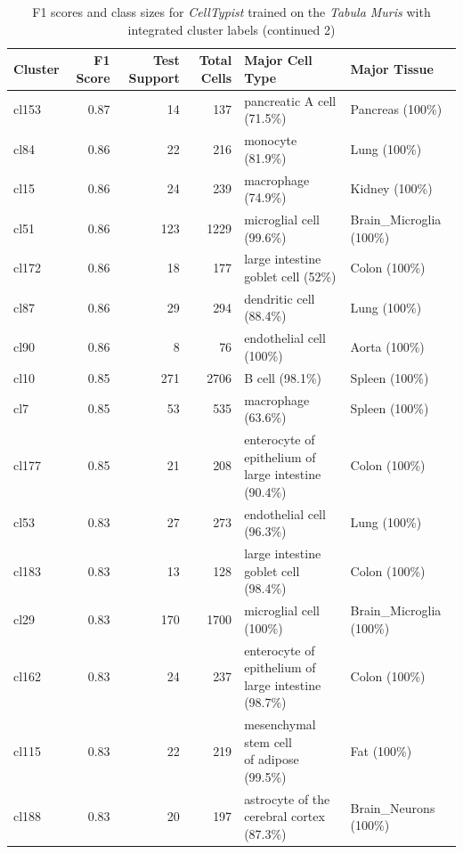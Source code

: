 \begin{table}[ht!]
\scriptsize
\caption[F1 scores and class sizes for \textit{CellTypist} trained on the \textit{Tabula Muris} with integrated cluster labels (continued 2)]{F1 scores and class sizes for \textit{CellTypist} trained on the \textit{Tabula Muris} with integrated cluster labels (continued 2)}
\centering
\label{table:tab_tmmodelclust2}
\begin{tabular}{lrrrll}
  \toprule
Cluster & F1 Score & Test Support & Total Cells & Major Cell Type & Major Tissue \\
  \midrule
  cl153 & 0.87 &  14 & 137 & pancreatic A cell (71.5\%) & Pancreas (100\%) \\ 
  cl84 & 0.86 &  22 & 216 & monocyte (81.9\%) & Lung (100\%) \\ 
  cl15 & 0.86 &  24 & 239 & macrophage (74.9\%) & Kidney (100\%) \\ 
  cl51 & 0.86 & 123 & 1229 & microglial cell (99.6\%) & Brain\_Microglia (100\%) \\ 
  cl172 & 0.86 &  18 & 177 & large intestine goblet cell (52\%) & Colon (100\%) \\ 
  cl87 & 0.86 &  29 & 294 & dendritic cell (88.4\%) & Lung (100\%) \\ 
  cl90 & 0.86 &   8 &  76 & endothelial cell (100\%) & Aorta (100\%) \\ 
  cl10 & 0.85 & 271 & 2706 & B cell (98.1\%) & Spleen (100\%) \\ 
  cl7 & 0.85 &  53 & 535 & macrophage (63.6\%) & Spleen (100\%) \\ 
  cl177 & 0.85 &  21 & 208 & \specialcell[t]{enterocyte of epithelium of\\large intestine (90.4\%)} & Colon (100\%) \\ 
  cl53 & 0.83 &  27 & 273 & endothelial cell (96.3\%) & Lung (100\%) \\ 
  cl183 & 0.83 &  13 & 128 & large intestine goblet cell (98.4\%) & Colon (100\%) \\ 
  cl29 & 0.83 & 170 & 1700 & microglial cell (100\%) & Brain\_Microglia (100\%) \\ 
  cl162 & 0.83 &  24 & 237 & \specialcell[t]{enterocyte of epithelium of\\large intestine (98.7\%)} & Colon (100\%) \\ 
  cl115 & 0.83 &  22 & 219 & \specialcell[t]{mesenchymal stem cell\\of adipose (99.5\%)} & Fat (100\%) \\ 
  cl188 & 0.83 &  20 & 197 & \specialcell[t]{astrocyte of the\\cerebral cortex (87.3\%)} & Brain\_Neurons (100\%) \\ 

\end{tabular}
\end{table}
